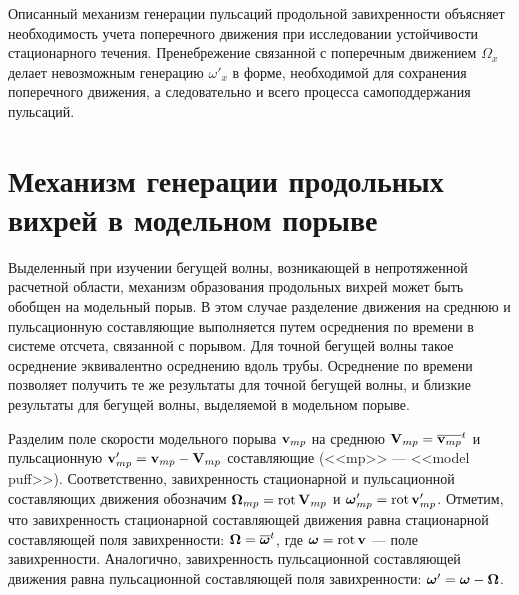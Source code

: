 Описанный механизм генерации пульсаций продольной завихренности объясняет необходимость учета поперечного движения при исследовании устойчивости стационарного течения. Пренебрежение связанной с поперечным движением $\Omega_x$ делает невозможным генерацию $\omega'_x$ в форме, необходимой для сохранения поперечного движения, а следовательно и всего процесса самоподдержания пульсаций.


\section{Механизм генерации продольных вихрей в модельном порыве}

Выделенный при изучении бегущей волны, возникающей в непротяженной расчетной области, механизм образования продольных вихрей может быть обобщен на модельный порыв. В этом случае разделение движения на среднюю и пульсационную составляющие выполняется путем осреднения по времени в системе отсчета, связанной с порывом. Для точной бегущей волны такое осреднение эквивалентно осреднению вдоль трубы. Осреднение по времени позволяет получить те же результаты для точной бегущей волны, и близкие результаты для бегущей волны, выделяемой в модельном порыве. 

Разделим поле скорости модельного порыва $\mathbf{v}_{mp}$ на среднюю $\mathbf{V}_{mp} = \overline{\mathbf{v}_{mp}}^t$ и пульсационную $\mathbf{v}'_{mp} = \mathbf{v}_{mp} - \mathbf{V}_{mp}$ составляющие (<<mp>> --- <<model puff>>). Соответственно, завихренность стационарной и пульсационной составляющих движения обозначим $\mbox{\boldmath$\Omega$}_{mp} = \mathop{}\!\operatorname{rot} \mathbf{V}_{mp}$ и $\mbox{\boldmath$\omega$}'_{mp} = \mathop{}\!\operatorname{rot} \mathbf{v}'_{mp}$. Отметим, что завихренность стационарной составляющей движения равна стационарной составляющей поля завихренности: $\mbox{\boldmath$\Omega$} = \overline{\mbox{\boldmath$\omega$}}^t$, где $\mbox{\boldmath$\omega$} = \mathop{}\!\operatorname{rot} \mathbf{v}$ --- поле завихренности. Аналогично, завихренность пульсационной составляющей движения равна пульсационной составляющей поля завихренности: $\mbox{\boldmath$\omega$}' = \mbox{\boldmath$\omega$} - \mbox{\boldmath$\Omega$}$. 

